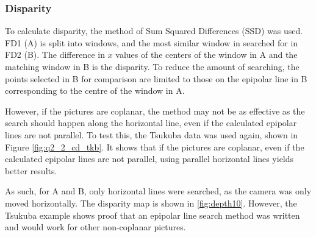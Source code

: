 \documentclass[a4paper, 10pt, conference]{ieeeconf}
\begin{document}
\subsubsection{Disparity}
To calculate disparity, the method of Sum Squared Differences (SSD) was used. FD1 (A) is split into windows, and the most similar window in searched for in FD2 (B). The difference in $x$ values of the centers of the window in A and the matching window in B is the disparity. To reduce the amount of searching, the points selected in B for comparison are limited to those on the epipolar line in B corresponding to the centre of the window in A.

However, if the pictures are coplanar, the method may not be as effective as the search should happen along the horizontal line, even if the calculated epipolar lines are not parallel. To test this, the Tsukuba data was used again, shown in Figure \ref{fig:q2_2_cd_tkb}. It shows that if the pictures are coplanar, even if the calculated epipolar lines are not parallel, using parallel horizontal lines yields better results.

As such, for A and B, only horizontal lines were searched, as the camera was only moved horizontally. The disparity map is shown in \ref{fig:depth10}.  However, the Tsukuba example shows proof that an epipolar line search method was written and would work for other non-coplanar pictures.
\end{document}
